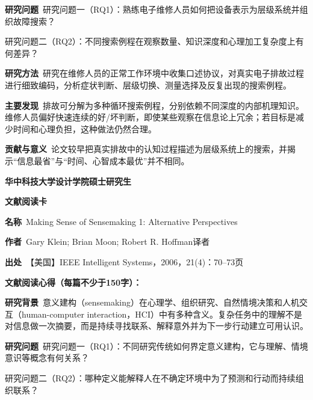 \noindent\textbf{研究问题}\ 研究问题一（RQ1）：熟练电子维修人员如何把设备表示为层级系统并组织故障搜索？\par
研究问题二（RQ2）：不同搜索例程在观察数量、知识深度和心理加工复杂度上有何差异？\par
\noindent\textbf{研究方法}\ 研究在维修人员的正常工作环境中收集口述协议，对真实电子排故过程进行细致编码，分析症状判断、层级切换、测量选择及反复出现的搜索例程。\par
\noindent\textbf{主要发现}\ 排故可分解为多种循环搜索例程，分别依赖不同深度的内部机理知识。维修人员偏好快速连续的好/坏判断，即使某些观察在信息论上冗余；若目标是减少时间和心理负担，这种做法仍然合理。\par
\noindent\textbf{贡献与意义}\ 论文较早把真实排故中的认知过程描述为层级系统上的搜索，并揭示“信息最省”与“时间、心智成本最优”并不相同。\par
\clearpage
\begin{center}
{\songti\bfseries\fontsize{18.5pt}{27.75pt}\selectfont 华中科技大学设计学院硕士研究生\par}
{\songti\bfseries\fontsize{18.5pt}{27.75pt}\selectfont 文献阅读卡\par}
\end{center}
\vspace{0.25em}
\noindent\underline{}\par
\vspace{0.35em}
\noindent\textbf{名称}\ Making Sense of Sensemaking 1: Alternative Perspectives\par
\noindent\textbf{作者}\ Gary Klein; Brian Moon; Robert R. Hoffman\quad 译者\par
\noindent\textbf{出处}\ 【美国】IEEE Intelligent Systems，2006，21(4)：70–73\quad 页\par
\vspace{0.35em}
\noindent\textbf{文献阅读心得（每篇不少于150字）：}\par
\noindent\textbf{研究背景}\ 意义建构（sensemaking）在心理学、组织研究、自然情境决策和人机交互（human-computer interaction，HCI）中有多种含义。复杂任务中的理解不是对信息做一次摘要，而是持续寻找联系、解释意外并为下一步行动建立可用认识。\par
\noindent\textbf{研究问题}\ 研究问题一（RQ1）：不同研究传统如何界定意义建构，它与理解、情境意识等概念有何关系？\par
研究问题二（RQ2）：哪种定义能解释人在不确定环境中为了预测和行动而持续组织联系？\par
